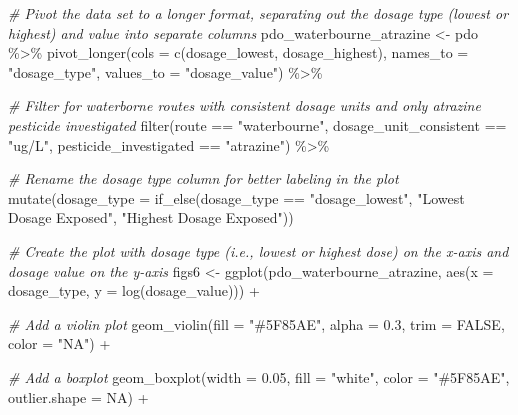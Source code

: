 \documentclass[
]{article}
\newenvironment{Shaded}{\begin{snugshade}}{\end{snugshade}}
\newcommand{\AttributeTok}[1]{\textcolor[rgb]{0.77,0.63,0.00}{#1}}
\newcommand{\CommentTok}[1]{\textcolor[rgb]{0.56,0.35,0.01}{\textit{#1}}}
\newcommand{\ConstantTok}[1]{\textcolor[rgb]{0.00,0.00,0.00}{#1}}
\newcommand{\FloatTok}[1]{\textcolor[rgb]{0.00,0.00,0.81}{#1}}
\newcommand{\FunctionTok}[1]{\textcolor[rgb]{0.00,0.00,0.00}{#1}}
\newcommand{\NormalTok}[1]{#1}
\newcommand{\OtherTok}[1]{\textcolor[rgb]{0.56,0.35,0.01}{#1}}
\newcommand{\SpecialCharTok}[1]{\textcolor[rgb]{0.00,0.00,0.00}{#1}}
\newcommand{\StringTok}[1]{\textcolor[rgb]{0.31,0.60,0.02}{#1}}
\begin{document}
\begin{Shaded}
\begin{Highlighting}[]
\CommentTok{\# Pivot the data set to a longer format, separating out the dosage type (lowest or highest) and value into separate columns}
\NormalTok{pdo\_waterbourne\_atrazine }\OtherTok{\textless{}{-}}\NormalTok{ pdo }\SpecialCharTok{\%\textgreater{}\%}
  \FunctionTok{pivot\_longer}\NormalTok{(}\AttributeTok{cols =} \FunctionTok{c}\NormalTok{(dosage\_lowest, dosage\_highest), }
               \AttributeTok{names\_to =} \StringTok{"dosage\_type"}\NormalTok{,}
               \AttributeTok{values\_to =} \StringTok{"dosage\_value"}\NormalTok{) }\SpecialCharTok{\%\textgreater{}\%} 

  \CommentTok{\# Filter for waterborne routes with consistent dosage units and only atrazine pesticide investigated}
  \FunctionTok{filter}\NormalTok{(route }\SpecialCharTok{==} \StringTok{"waterbourne"}\NormalTok{, dosage\_unit\_consistent }\SpecialCharTok{==} \StringTok{"ug/L"}\NormalTok{, pesticide\_investigated }\SpecialCharTok{==} \StringTok{"atrazine"}\NormalTok{) }\SpecialCharTok{\%\textgreater{}\%}  

  \CommentTok{\# Rename the dosage type column for better labeling in the plot}
  \FunctionTok{mutate}\NormalTok{(}\AttributeTok{dosage\_type =} \FunctionTok{if\_else}\NormalTok{(dosage\_type }\SpecialCharTok{==} \StringTok{"dosage\_lowest"}\NormalTok{, }\StringTok{"Lowest Dosage Exposed"}\NormalTok{, }\StringTok{"Highest Dosage Exposed"}\NormalTok{))}

\CommentTok{\# Create the plot with dosage type (i.e., lowest or highest dose) on the x{-}axis and dosage value on the y{-}axis}
\NormalTok{figs6 }\OtherTok{\textless{}{-}} \FunctionTok{ggplot}\NormalTok{(pdo\_waterbourne\_atrazine, }\FunctionTok{aes}\NormalTok{(}\AttributeTok{x =}\NormalTok{ dosage\_type, }\AttributeTok{y =} \FunctionTok{log}\NormalTok{(dosage\_value))) }\SpecialCharTok{+}

  \CommentTok{\# Add a violin plot }
  \FunctionTok{geom\_violin}\NormalTok{(}\AttributeTok{fill =} \StringTok{"\#5F85AE"}\NormalTok{, }\AttributeTok{alpha =} \FloatTok{0.3}\NormalTok{, }\AttributeTok{trim =} \ConstantTok{FALSE}\NormalTok{, }\AttributeTok{color =} \StringTok{"NA"}\NormalTok{) }\SpecialCharTok{+}

  \CommentTok{\# Add a boxplot }
  \FunctionTok{geom\_boxplot}\NormalTok{(}\AttributeTok{width =} \FloatTok{0.05}\NormalTok{, }\AttributeTok{fill =} \StringTok{"white"}\NormalTok{, }\AttributeTok{color =} \StringTok{"\#5F85AE"}\NormalTok{, }\AttributeTok{outlier.shape =} \ConstantTok{NA}\NormalTok{) }\SpecialCharTok{+}


\end{Highlighting}
\end{Shaded}
\end{document}
